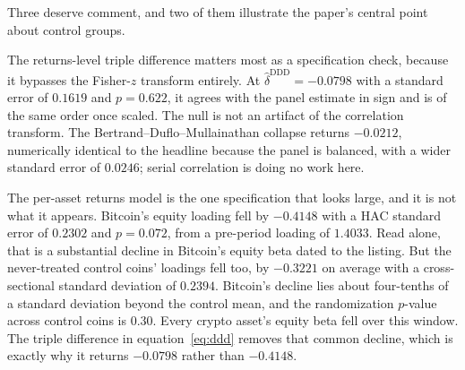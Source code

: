 \documentclass[12pt,a4paper]{article}
\begin{document}
Three deserve comment, and two of them illustrate the paper's central point about control groups.

The returns-level triple difference matters most as a specification check, because it bypasses the Fisher-$z$ transform entirely. At
$\hat\delta^{\mathrm{DDD}} = -0.0798$ with a standard error of $0.1619$ and
$p = 0.622$, it agrees with the panel estimate in sign and is of the same order once scaled. The null is not an artifact of the correlation transform. The Bertrand--Duflo--Mullainathan collapse returns
$-0.0212$, numerically identical to the headline because the panel is balanced, with a wider standard error of
$0.0246$; serial correlation is doing no work here.



The per-asset returns model is the one specification that looks large, and it is not what it appears. Bitcoin's equity loading fell by
$-0.4148$ with a HAC standard error of $0.2302$ and
$p = 0.072$, from a pre-period loading of
$1.4033$. Read alone, that is a substantial decline in Bitcoin's equity beta dated to the listing. But the never-treated control coins' loadings fell too, by
$-0.3221$ on average with a cross-sectional standard deviation of
$0.2394$. Bitcoin's decline lies about four-tenths of a standard deviation beyond the control mean,
and the randomization $p$-value across control coins is
$0.30$. Every crypto asset's equity beta fell over this window. The triple difference in equation~\eqref{eq:ddd} removes that common decline, which is exactly why it returns $-0.0798$ rather than $-0.4148$.
\end{document}
